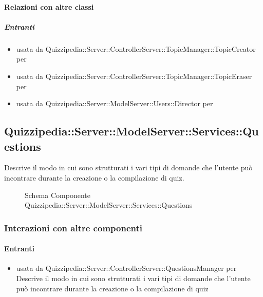 \paragraph{Relazioni con altre classi}
\subparagraph{Entranti}
\begin{itemize}
\item usata da Quizzipedia::Server::ControllerServer::TopicManager::TopicCreator per 
\item usata da Quizzipedia::Server::ControllerServer::TopicManager::TopicEraser per 
\item usata da Quizzipedia::Server::ModelServer::Users::Director per 
\end{itemize}
\subsection{Quizzipedia::Server::ModelServer::Services::Questions}
Descrive il modo in cui sono strutturati i vari tipi di domande che l'utente può incontrare durante la creazione o la compilazione di quiz.
\begin{figure}[H]
\centering
\noindent{}
\caption[Schema Componente Quizzipedia::Server::ModelServer::Services::Questions]{Schema Componente Quizzipedia::Server::ModelServer::Services::Questions}
\end{figure}
\subsubsection{Interazioni con altre componenti}
\paragraph{Entranti}
\begin{itemize}
\item usata da Quizzipedia::Server::ControllerServer::QuestionsManager per Descrive il modo in cui sono strutturati i vari tipi di domande che l'utente può incontrare durante la creazione o la compilazione di quiz
\end{itemize}
